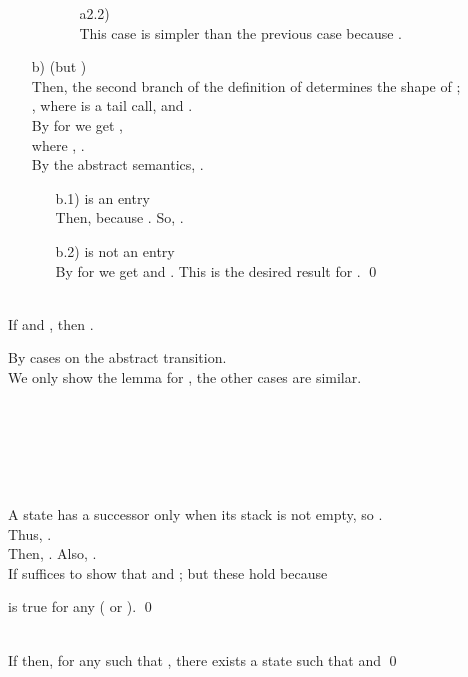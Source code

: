 \documentclass{LMCS}
\theoremstyle{definition} \newtheorem{property}[thm]{Property}
\begin{document}
\begin{enumerate}[]
\begin{enumerate}[]
\begin{enumerate}[]
\begin{enumerate}[]
              \end{enumerate}
            \item[a2.2)]
               \\
              This case is simpler than the previous case because
              .
            \end{enumerate}
  \end{enumerate}
\item[b)]
   (but ) \\
  Then, the second branch of the definition of \dcorens{} determines the
  shape of ; \\
  ,
  where \astato{} is a tail call, 
  and . \\
  By \ih{} for  
  we get , \\
  where , 
  . \\
  By the abstract semantics, 
  .
  \begin{enumerate}[] 
  \item[b.1)]
    \astat{} is an entry \\
    Then,  because .
    So, .
  \item[b.2)]
    \astat{} is not an entry \\
    By \ih{} for  we get
     and 
    .
    This is the desired result for .
    \qed
  \end{enumerate}
\end{enumerate}


\begin{lem}\label{lem:localsim} ~\\
If  and ,
then .
\end{lem}
\proof
By cases on the abstract transition. \\
We only show the lemma for , the other cases are similar. \\
 \\
 \\
 \\
 \\
 \\ ~\\
A \daueval{} state has a successor only when its stack is not empty,
so . \\
Thus, . \\
Then, . 
Also, . \\
If suffices to show that  and 
; but these hold because 
 
is true for any  ( or \mulam{}).
\qed

\begin{lem}\label{lem:localsim-converse} ~\\
  If  then, 
  for any \astat{} such that , 
  there exists a state  such that 
   and 
  \qed
\end{lem}
\end{document}
